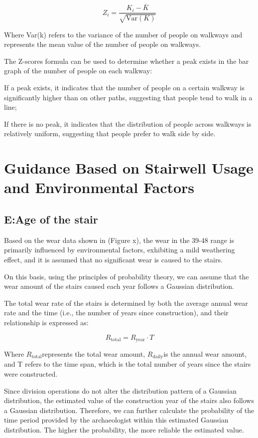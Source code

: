 \documentclass{mcmthesis}
\begin{document}
\[ Z_i = \frac{K_i - \bar{K}}{\sqrt{\text{Var}(K)}} \]

Where Var(k) refers to the variance of the number of people on walkways and represents the mean value of the number of people on walkways.

The Z-scores formula can be used to determine whether a peak exists in the bar graph of the number of people on each walkway:


If a peak exists, it indicates that the number of people on a certain walkway is significantly higher than on other paths, suggesting that people tend to walk in a line;

If there is no peak, it indicates that the distribution of people across walkways is relatively uniform, suggesting that people prefer to walk side by side.

\section{Guidance Based on Stairwell Usage and Environmental Factors}
\subsection{E:Age of the stair }

Based on the wear data shown in (Figure x), the wear in the 39-48 range is primarily influenced by environmental factors, exhibiting a mild weathering effect, and it is assumed that no significant wear is caused to the stairs.

On this basis, using the principles of probability theory, we can assume that the wear amount of the stairs caused each year follows a Gaussian distribution.

The total wear rate of the stairs is determined by both the average annual wear rate and the time (i.e., the number of years since construction), and their relationship is expressed as:

\[R_{\text{total}} = R_{\text{year}} \cdot T \]

Where $R_{\text{total}}$​ represents the total wear amount, $R_{\text{daily}}$​ is the annual wear amount, and T refers to the time span, which is the total number of years since the stairs were constructed.

Since division operations do not alter the distribution pattern of a Gaussian distribution, the estimated value of the construction year of the stairs also follows a Gaussian distribution. Therefore, we can further calculate the probability of the time period provided by the archaeologist within this estimated Gaussian distribution. The higher the probability, the more reliable the estimated value.
\end{document}
